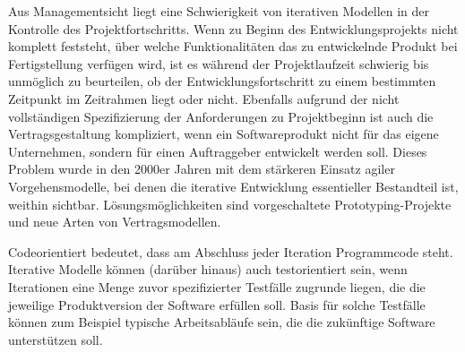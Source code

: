 Aus Managementsicht liegt eine Schwierigkeit von iterativen Modellen in der Kontrolle des Projektfortschritts. Wenn zu Beginn des Entwicklungsprojekts nicht komplett feststeht, über welche Funktionalitäten das zu entwickelnde Produkt bei Fertigstellung verfügen wird, ist es während der Projektlaufzeit schwierig bis unmöglich zu beurteilen, ob der Entwicklungsfortschritt zu einem bestimmten Zeitpunkt im Zeitrahmen liegt oder nicht. Ebenfalls aufgrund der nicht vollständigen Spezifizierung der Anforderungen zu Projektbeginn ist auch die Vertragsgestaltung kompliziert, wenn ein Softwareprodukt nicht für das eigene Unternehmen, sondern für einen Auftraggeber entwickelt werden soll. Dieses Problem wurde in den 2000er Jahren mit dem stärkeren Einsatz agiler Vorgehensmodelle, bei denen die iterative Entwicklung essentieller Bestandteil ist, weithin sichtbar. Lösungsmöglichkeiten sind vorgeschaltete Prototyping-Projekte und neue Arten von Vertragsmodellen.

 
Codeorientiert bedeutet, dass am Abschluss jeder Iteration Programmcode steht. Iterative Modelle können (darüber hinaus) auch testorientiert sein, wenn Iterationen eine Menge zuvor spezifizierter Testfälle zugrunde liegen, die die jeweilige Produktversion der Software erfüllen soll. Basis für solche Testfälle können zum Beispiel typische Arbeitsabläufe sein, die die zukünftige Software unterstützen soll. 

